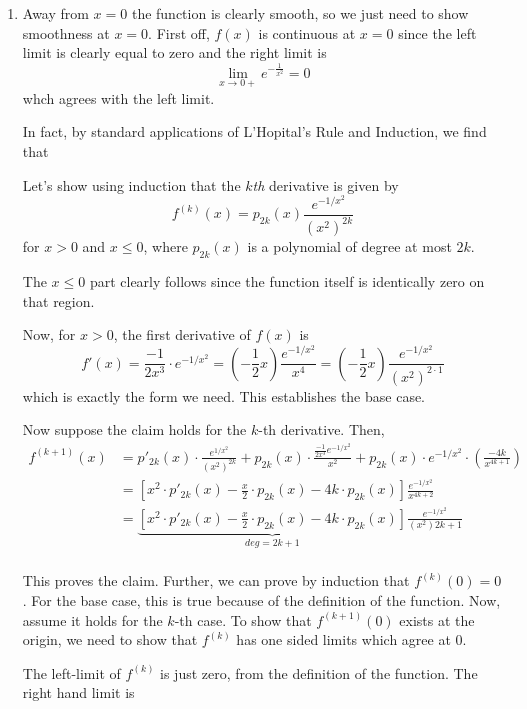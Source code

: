 \documentclass{article}
\begin{document}
\begin{enumerate}[label=(\alph*)]
  \item Away from $x = 0$ the function is clearly smooth, so we just need to show smoothness at $x = 0$. First off, $f(x)$ is continuous at $x = 0$ since the left limit is clearly equal to zero and the right limit is 
  \[ \lim_{x \rightarrow 0+} e^{-\frac{1}{x^2}} = 0  \]
  whch agrees with the left limit.

  In fact, by standard applications of L'Hopital's Rule and Induction, we find that

  Let's show using induction that the $k$\emph{th} derivative is given by 
  \[ f^{(k)}(x) = p_{2k}(x) \frac{e^{-1/x^2}}{(x^2)^{2k}} \]
  for $x > 0$ and $x \leq 0$, where $p_{2k}(x)$ is a polynomial of degree at most $2k$.
  \vskip 0.5cm

  The $x \leq 0$ part clearly follows since the function itself is identically zero on that region.

  \vskip 0.5cm
  Now, for $x > 0$, the first derivative of $f(x)$ is 
  \[ f'(x) = \frac{-1}{2x^3} \cdot e^{-1/x^2} = \left(-\frac{1}{2}x\right) \frac{e^{-1/x^2}}{x^4} = \left(-\frac{1}{2}x\right) \frac{e^{-1/x^2}}{(x^2)^{2 \cdot 1}} \]
  which is exactly the form we need. This establishes the base case.

  \vskip 0.5cm
  Now suppose the claim holds for the $k$-th derivative. Then, 
  \begin{align*}
    f^{(k+1)}(x) &= p'_{2k}(x) \cdot \frac{e^{1/x^2}}{(x^2)^{2k}} + p_{2k}(x) \cdot \frac{ \frac{-1}{2x^3} e^{-1/x^2}}{x^2} + p_{2k}(x) \cdot e^{-1/x^2} \cdot \left(\frac{-4k}{x^{4k+1}}\right) \\
    &= \left[ x^2 \cdot p'_{2k}(x) - \frac{x}{2} \cdot p_{2k}(x) - 4k \cdot p_{2k}(x) \right] \frac{e^{-1/x^2}}{x^{4k+2}} \\
    &= \underbrace{\left[ x^2 \cdot p'_{2k}(x) - \frac{x}{2} \cdot p_{2k}(x) - 4k \cdot p_{2k}(x) \right]}_{deg = 2k+1} \frac{e^{-1/x^2}}{(x^2){2k+1}} \\
  \end{align*}

  This proves the claim. Further, we can prove by induction that $f^{(k)}(0) = 0$. For the base case, this is true because of the definition of the function. Now, assume it holds for the $k$-th case. To show that $f^{(k+1)}(0)$ exists at the origin, we need to show that $f^{(k)}$ has one sided limits which agree at $0$.

  \vskip 0.5cm 
  The left-limit of $f^{(k)}$ is just zero, from the definition of the function. The right hand limit is 


\end{enumerate}
\end{document}
